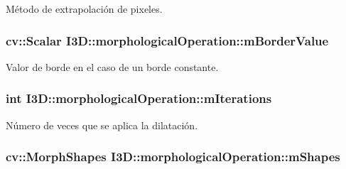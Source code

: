 Método de extrapolación de pixeles. 

\subsubsection[{\texorpdfstring{m\+Border\+Value}{mBorderValue}}]{\setlength{\rightskip}{0pt plus 5cm}cv\+::\+Scalar I3\+D\+::morphological\+Operation\+::m\+Border\+Value\hspace{0.3cm}{\ttfamily [protected]}}\hypertarget{class_i3_d_1_1morphological_operation_a9af41bcd3b3e9c5d44bbfdc31a707a9c}{}\label{class_i3_d_1_1morphological_operation_a9af41bcd3b3e9c5d44bbfdc31a707a9c}


Valor de borde en el caso de un borde constante. 

\subsubsection[{\texorpdfstring{m\+Iterations}{mIterations}}]{\setlength{\rightskip}{0pt plus 5cm}int I3\+D\+::morphological\+Operation\+::m\+Iterations\hspace{0.3cm}{\ttfamily [protected]}}\hypertarget{class_i3_d_1_1morphological_operation_a559f56b17ef0ebbbba5e5a88c3bb113a}{}\label{class_i3_d_1_1morphological_operation_a559f56b17ef0ebbbba5e5a88c3bb113a}


Número de veces que se aplica la dilatación. 

\subsubsection[{\texorpdfstring{m\+Shapes}{mShapes}}]{\setlength{\rightskip}{0pt plus 5cm}cv\+::\+Morph\+Shapes I3\+D\+::morphological\+Operation\+::m\+Shapes\hspace{0.3cm}{\ttfamily [protected]}}\hypertarget{class_i3_d_1_1morphological_operation_a15b21c649cbb7f4f86625005c2390be3}{}\label{class_i3_d_1_1morphological_operation_a15b21c649cbb7f4f86625005c2390be3}


